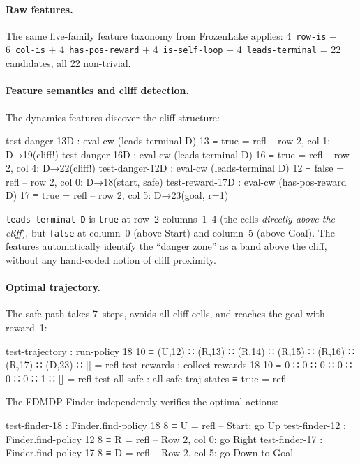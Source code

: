 \paragraph{Raw features.}
The same five-family feature taxonomy from FrozenLake applies: 4~\texttt{row-is} + 6~\texttt{col-is} + 4~\texttt{has-pos-reward} + 4~\texttt{is-self-loop} + 4~\texttt{leads-terminal} = 22 candidates, all 22 non-trivial.

\paragraph{Feature semantics and cliff detection.}
The dynamics features discover the cliff structure:

\begin{spec}
test-danger-13D : eval-cw (leads-terminal D) 13 ≡ true  = refl   -- row 2, col 1: D→19(cliff!)
test-danger-16D : eval-cw (leads-terminal D) 16 ≡ true  = refl   -- row 2, col 4: D→22(cliff!)
test-danger-12D : eval-cw (leads-terminal D) 12 ≡ false = refl   -- row 2, col 0: D→18(start, safe)
test-reward-17D : eval-cw (has-pos-reward D)  17 ≡ true = refl   -- row 2, col 5: D→23(goal, r=1)
\end{spec}

\noindent \texttt{leads-terminal~D} is \texttt{true} at row~2 columns~1--4 (the cells \emph{directly above the cliff}), but \texttt{false} at column~0 (above Start) and column~5 (above Goal).  The features automatically identify the ``danger zone'' as a band above the cliff, without any hand-coded notion of cliff proximity.

\paragraph{Optimal trajectory.}
The safe path takes 7~steps, avoids all cliff cells, and reaches the goal with reward~1:

\begin{spec}
test-trajectory : run-policy 18 10
  ≡ (U,12) ∷ (R,13) ∷ (R,14) ∷ (R,15) ∷ (R,16) ∷ (R,17) ∷ (D,23) ∷ []  = refl
test-rewards : collect-rewards 18 10 ≡ 0 ∷ 0 ∷ 0 ∷ 0 ∷ 0 ∷ 0 ∷ 1 ∷ []     = refl
test-all-safe : all-safe traj-states  ≡ true                                  = refl
\end{spec}

\noindent The FDMDP Finder independently verifies the optimal actions:

\begin{spec}
test-finder-18 : Finder.find-policy 18 8 ≡ U  = refl    -- Start: go Up
test-finder-12 : Finder.find-policy 12 8 ≡ R  = refl    -- Row 2, col 0: go Right
test-finder-17 : Finder.find-policy 17 8 ≡ D  = refl    -- Row 2, col 5: go Down to Goal
\end{spec}

